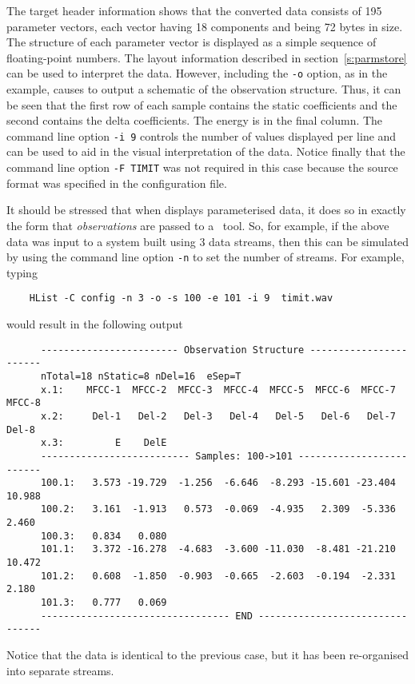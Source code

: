 The target header information shows that the converted data consists
of 195 parameter vectors, each vector having 18 components and being 72 bytes in
size.  The structure of each parameter vector is displayed as a simple sequence
of floating-point numbers.   The layout information described in 
section~\ref{s:parmstore} can be used to interpret the data.  
However, including the \texttt{-o} option, as in the example, causes 
to output a schematic of the observation structure.  Thus, it can be seen that
the first row of each sample contains the static coefficients and the second 
contains the delta
coefficients.  The energy is in the final column.
The command line option \texttt{-i 9} controls the number of values displayed
per line and can be used to aid in the visual interpretation of the data.
Notice finally that the command line option \texttt{-F TIMIT} was not required
in this case because the source format was specified in the configuration file.

It should be stressed that when  displays parameterised data,
it does so in exactly the form that \textit{observations} are passed to
a \HTK\ tool.  So, for example, if the above data was input to a system
built using 3 data streams, then this can be simulated by using the
command line option \texttt{-n} to set the number of streams.  For example, typing
\begin{verbatim}
    HList -C config -n 3 -o -s 100 -e 101 -i 9  timit.wav
\end{verbatim}
would result in the following output
\begin{verbatim}
      ------------------------ Observation Structure -----------------------
      nTotal=18 nStatic=8 nDel=16  eSep=T
      x.1:    MFCC-1  MFCC-2  MFCC-3  MFCC-4  MFCC-5  MFCC-6  MFCC-7  MFCC-8
      x.2:     Del-1   Del-2   Del-3   Del-4   Del-5   Del-6   Del-7   Del-8
      x.3:         E    DelE
      -------------------------- Samples: 100->101 -------------------------
      100.1:   3.573 -19.729  -1.256  -6.646  -8.293 -15.601 -23.404  10.988
      100.2:   3.161  -1.913   0.573  -0.069  -4.935   2.309  -5.336   2.460
      100.3:   0.834   0.080
      101.1:   3.372 -16.278  -4.683  -3.600 -11.030  -8.481 -21.210  10.472
      101.2:   0.608  -1.850  -0.903  -0.665  -2.603  -0.194  -2.331   2.180
      101.3:   0.777   0.069
      --------------------------------- END --------------------------------
\end{verbatim}
Notice that the data is identical to the previous case, but it has been
re-organised into separate streams.

